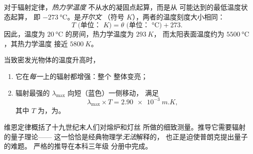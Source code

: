 \begin{definition}[热力学温度]\label{def:g10:light-spectra:kelvin}
对于辐射定律，\emph{热力学温度}
不从水的凝固点起算，而是从
可能达到的最低温度状态起算，
即 $\qty{-273}{\degreeCelsius}$。是\emph{开尔文}
（符号 $\unit{K}$），两者的温度刻度大小相同：
\[
T \text{ (单位： } \unit{K}) = \theta \text{ (单位： } \unit{\degreeCelsius}) + 273 .
\]
因此，温度为 $\qty{20}{\degreeCelsius}$ 的房间，热力学温度为 $\qty{293}{K}$，
而太阳表面温度约为 $\qty{5500}{\degreeCelsius}$，其热力学温度
接近 $\qty{5800}{K}$。
\end{definition}

\begin{proposition}\label{prop:g10:light-spectra:wien}
当致密发光物体的温度升高时，
\begin{enumerate}
  \item 它在\emph{每一}上的辐射都增强：整个
        整体变亮；
  \item 辐射最强的 $\lambda_{\max}$
        向短（蓝色）一侧移动，
        满足
        \[
        \lambda_{\max} \times T = \qty{2.90e-3}{m.K},
        \]
        其中 $T$ 为，为。
\end{enumerate}
\end{proposition}
\admitted

\begin{remark}[这一定律的来源]\label{rem:g10:light-spectra:wienorigin}
维恩定律概括了十九世纪末人们对熔炉和灯丝
所做的细致测量。推导它需要辐射的量子理论——
这一恰恰是经典物理学\emph{无法}解释的，
也正是迫使普朗克提出量子的难题。
严格的推导在本科三年级
分册中完成。
\end{remark}

